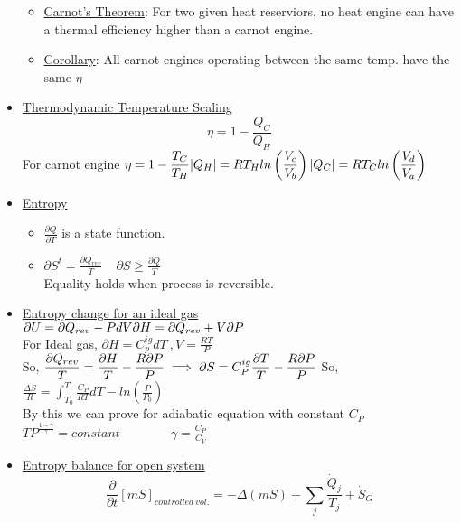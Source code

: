 \documentclass[12pt]{article}
\begin{document}
\begin{itemize}
\begin{tikzpicture}[x=0.75pt,y=0.75pt,yscale=-1,xscale=1]
\end{tikzpicture}
	\begin{itemize}
	\item \underline{Carnot's Theorem}: For two given heat reserviors, no heat engine can have a thermal efficiency higher than a carnot engine.
	\item \underline{ Corollary}: All carnot engines operating between the same temp. have the same $\eta$
	\end{itemize}
	\item \underline{Thermodynamic Temperature Scaling}\\
	\[ \eta=1-\frac{Q_C}{Q_H}\]
	For carnot engine $\displaystyle \eta=1-\frac{T_C}{T_H}\\
	|Q_H|=RT_Hln\left(\frac{V_c}{V_b}\right)\\
	|Q_C|=RT_Cln\left(\frac{V_d}{V_a}\right)$
	\item \underline{Entropy}
	\begin{itemize}
	\item $\displaystyle \frac{\partial Q}{\partial T}$ is a state function.
	\item $\displaystyle \partial S^t=\frac{\partial Q_{rev}}{T} \ \ \ \ \ 
	\partial S \geq \frac{\partial Q}{T}$\\
	Equality holds when process is reversible.
	\end{itemize}
	\item \underline{Entropy change for an ideal gas}\\
	$\displaystyle \partial U=\partial Q_{rev}-PdV\\
	\partial H= \partial Q_{rev}+V\partial P$\\
	For Ideal gas, $\displaystyle \partial H= C_p^{ig}dT\ , V=\frac{RT}{P}$\\
	So, $\displaystyle \frac{\partial Q_{rev}}{T} = \frac{\partial H}{T} - \frac{R\partial P}{P} \\ \\
	\implies \partial S = C_P^{ig}\frac{\partial T}{T} - \frac{R\partial P}{P}$
	So, $\displaystyle \frac{\Delta S}{R} = \int_{T_0}^{T}\frac{C_P}{RT}dT-ln\left(\frac{P}{P_0}\right)$\\
	By this we can prove for adiabatic equation with constant $C_P$\\
	$TP^{\frac{1-\gamma}{\gamma}}=constant$\ \ \ \ \ \ \ \ $\gamma=\frac{C_P}{C_V}$\
	\item \underline{Entropy balance for open system}\\
	\[\frac{\partial}{\partial t}[mS]_{controlled\ vol.}= -\Delta(\dot m S)+ \sum_j\frac{\dot Q_j}{T_j}+\dot S_G\]

\end{itemize}
\end{document}
